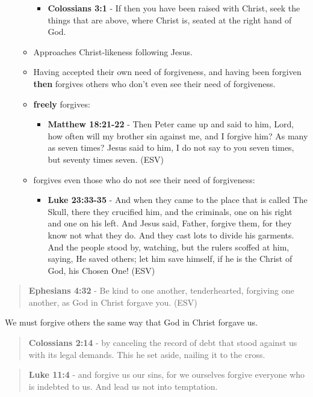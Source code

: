 \documentclass[11pt]{article}
\begin{document}
\begin{itemize}
\begin{itemize}
\begin{itemize}
\item \textbf{Colossians 3:1} - If then you have been raised with Christ, seek the things that are above, where Christ is, seated at the right hand of God.
\end{itemize}
\item Approaches Christ-likeness following Jesus.
\item Having accepted their own need of forgiveness, and having been forgiven \textbf{then} forgives others who don't even see their need of forgiveness.
\item \textbf{freely} forgives:
\begin{itemize}
\item \textbf{Matthew 18:21-22} -  Then Peter came up and said to him, Lord, how often will my brother sin against me, and I forgive him?  As many as seven times?  Jesus said to him, I do not say to you seven times, but seventy times seven. (ESV)
\end{itemize}
\item forgives even those who do not see their need of forgiveness:
\begin{itemize}
\item \textbf{Luke 23:33-35} - And when they came to the place that is called The Skull, there they crucified him, and the criminals, one on his right and one on his left.  And Jesus said, Father, forgive them, for they know not what they do. And they cast lots to divide his garments.  And the people stood by, watching, but the rulers scoffed at him, saying, He saved others; let him save himself, if he is the Christ of God, his Chosen One! (ESV)
\end{itemize}
\end{itemize}
\end{itemize}

\begin{quote}
\textbf{Ephesians 4:32} - Be kind to one another, tenderhearted, forgiving one another, as God in Christ forgave you. (ESV)
\end{quote}

We must forgive others the same way that God in Christ forgave us.

\begin{quote}
\textbf{Colossians 2:14} - by canceling the record of debt that stood against us with its legal demands. This he set aside, nailing it to the cross.
\end{quote}

\begin{quote}
\textbf{Luke 11:4} - and forgive us our sins, for we ourselves forgive everyone who is indebted to us. And lead us not into temptation.
\end{quote}
\end{document}
